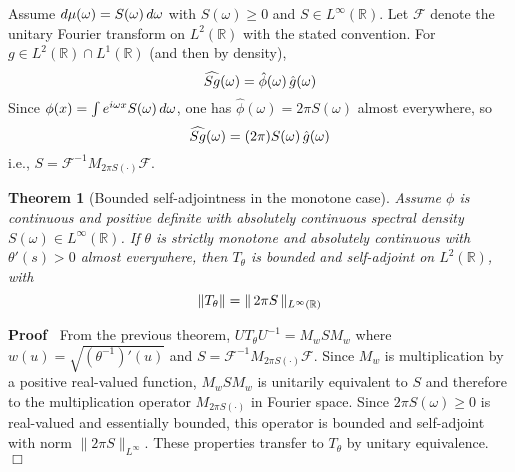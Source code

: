 \documentclass{article}
\newcommand{\cdummy}{\cdot}
\newenvironment{proof}{\noindent\textbf{Proof\ }}{\hspace*{\fill}$\Box$\medskip}
{\theorembodyfont{\rmfamily}\newtheorem{example}{Example}}
\newtheorem{theorem}{Theorem}
\begin{document}
Assume $d \mu (\omega) = S (\omega)  \hspace{0.17em} d \omega$ with $S
(\omega) \ge 0$ and $S \in L^{\infty} (\mathbb{R})$. Let $\mathcal{F}$ denote
the unitary Fourier transform on $L^2 (\mathbb{R})$ with the stated
convention. For $g \in L^2 (\mathbb{R}) \cap L^1 (\mathbb{R})$ (and then by
density),
\begin{equation}
  \widehat{Sg} (\omega) = \hat{\phi} (\omega)  \hspace{0.17em} \hat{g}
  (\omega)
\end{equation}
Since $\phi (x) = \int e^{i \omega x} S (\omega)  \hspace{0.17em} d \omega$,
one has $\hat{\phi} (\omega) = 2 \pi S (\omega)$ almost everywhere, so
\begin{equation}
  \widehat{Sg} (\omega) = (2 \pi) S (\omega)  \hspace{0.17em} \hat{g} (\omega)
\end{equation}
i.e., $S =\mathcal{F}^{- 1} M_{2 \pi S (\cdummy)} \mathcal{F}$.

\begin{theorem}[Bounded self-adjointness in the monotone case]
  Assume $\phi$ is continuous and positive definite with absolutely continuous
  spectral density $S (\omega) \in L^{\infty} (\mathbb{R})$. If $\theta$ is
  strictly monotone and absolutely continuous with $\theta' (s) > 0$ almost
  everywhere, then $T_{\theta}$ is bounded and self-adjoint on $L^2
  (\mathbb{R})$, with
  \begin{equation}
    \|T_{\theta} \| = \| \hspace{0.17em} 2 \pi S \hspace{0.17em}
    \|_{L^{\infty} (\mathbb{R})}
  \end{equation}
\end{theorem}

\begin{proof}
  From the previous theorem, $UT_{\theta} U^{- 1} = M_w SM_w$ where $w (u) =
  \sqrt{(\theta^{- 1})' (u)}$ and $S =\mathcal{F}^{- 1} M_{2 \pi S (\cdummy)}
  \mathcal{F}$. Since $M_w$ is multiplication by a positive real-valued
  function, $M_w SM_w$ is unitarily equivalent to $S$ and therefore to the
  multiplication operator $M_{2 \pi S (\cdummy)}$ in Fourier space. Since $2
  \pi S (\omega) \geq 0$ is real-valued and essentially bounded, this operator
  is bounded and self-adjoint with norm $\|2 \pi S\|_{L^{\infty}}$. These
  properties transfer to $T_{\theta}$ by unitary equivalence.
\end{proof}
\end{document}
